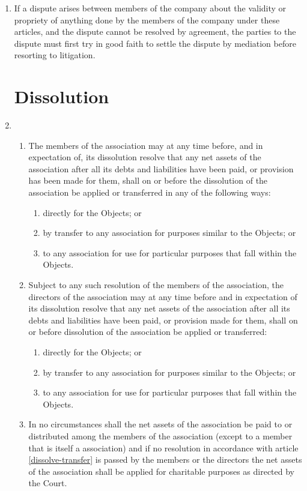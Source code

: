 \begin{enumerate}
\item
    If a dispute arises between members of the company about the validity
    or propriety of anything done by the members of the company under these
    articles, and the dispute cannot be resolved by agreement, the parties
    to the dispute must first try in good faith to settle the dispute by
    mediation before resorting to litigation.

\section{Dissolution}

\item
  \begin{enumerate}
  \item \label{dissolve-transfer}
    The members of the association may at any time before, and in
    expectation of, its dissolution resolve that any net assets of the
    association after all its debts and liabilities have been paid, or
    provision has been made for them, shall on or before the
    dissolution of the association be applied or transferred in any of the
    following ways:
    \begin{enumerate}
    \item
      directly for the Objects; or
    \item
      by transfer to any association for purposes similar to the
      Objects; or
    \item
      to any association for use for particular purposes that
      fall within the Objects.
    \end{enumerate}
  \item
    Subject to any such resolution of the members of the association, the
    directors of the association may at any time before and in expectation
    of its dissolution resolve that any net assets of the association after
    all its debts and liabilities have been paid, or provision made for
    them, shall on or before dissolution of the association be applied or
    transferred:
    \begin{enumerate}
    \item
      directly for the Objects; or
    \item
      by transfer to any association for purposes similar to the
      Objects; or
    \item
      to any association for use for particular purposes that
      fall within the Objects.
    \end{enumerate}
  \item
    In no circumstances shall the net assets of the association be paid to
    or distributed among the members of the association (except to a member
    that is itself a association) and if no resolution in accordance with
    article \ref{dissolve-transfer} is passed by the members or the directors the net
    assets of the association shall be applied for charitable purposes as
    directed by the Court.
  \end{enumerate}
\end{enumerate}
